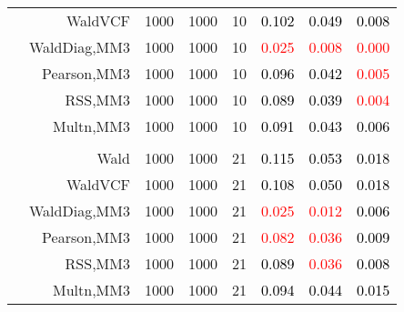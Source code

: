 \documentclass[
]{article}
\begin{document}
\begin{table}[H]
{\begin{tabular}[t]{lrrrrrrr}
\hspace{1em} & WaldVCF & 1000 & 1000 & 10 & \textcolor{black}{0.102} & \textcolor{black}{0.049} & \textcolor{black}{0.008}\\

\hspace{1em} & WaldDiag,MM3 & 1000 & 1000 & 10 & \textcolor{red}{0.025} & \textcolor{red}{0.008} & \textcolor{red}{0.000}\\

\hspace{1em} & Pearson,MM3 & 1000 & 1000 & 10 & \textcolor{black}{0.096} & \textcolor{black}{0.042} & \textcolor{red}{0.005}\\

\hspace{1em} & RSS,MM3 & 1000 & 1000 & 10 & \textcolor{black}{0.089} & \textcolor{black}{0.039} & \textcolor{red}{0.004}\\

\hspace{1em} & Multn,MM3 & 1000 & 1000 & 10 & \textcolor{black}{0.091} & \textcolor{black}{0.043} & \textcolor{black}{0.006}\\
\cmidrule{1-8}
\addlinespace[0.3em]
\multicolumn{8}{l}{\textbf{3F 15V}}\\
\hspace{1em} & Wald & 1000 & 1000 & 21 & \textcolor{black}{0.115} & \textcolor{black}{0.053} & \textcolor{black}{0.018}\\

\hspace{1em} & WaldVCF & 1000 & 1000 & 21 & \textcolor{black}{0.108} & \textcolor{black}{0.050} & \textcolor{black}{0.018}\\

\hspace{1em} & WaldDiag,MM3 & 1000 & 1000 & 21 & \textcolor{red}{0.025} & \textcolor{red}{0.012} & \textcolor{black}{0.006}\\

\hspace{1em} & Pearson,MM3 & 1000 & 1000 & 21 & \textcolor{red}{0.082} & \textcolor{red}{0.036} & \textcolor{black}{0.009}\\

\hspace{1em} & RSS,MM3 & 1000 & 1000 & 21 & \textcolor{black}{0.089} & \textcolor{red}{0.036} & \textcolor{black}{0.008}\\

\hspace{1em} & Multn,MM3 & 1000 & 1000 & 21 & \textcolor{black}{0.094} & \textcolor{black}{0.044} & \textcolor{black}{0.015}\\
\bottomrule
\end{tabular}}
\endgroup{}
\end{table}
\end{document}
